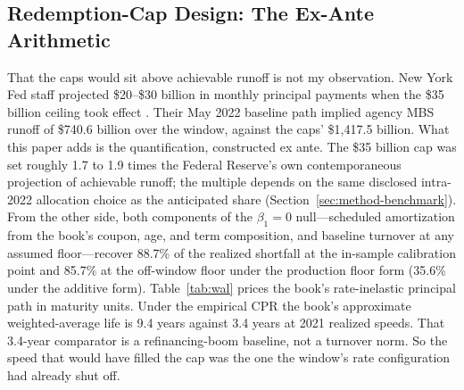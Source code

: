 \subsection{Redemption-Cap Design: The Ex-Ante Arithmetic}\label{sec:discussion-capdesign}

That the caps would sit above achievable runoff is not my observation. New York Fed staff projected \$20--\$30 billion in monthly principal payments when the \$35 billion ceiling took effect \citep{nyfed2022}. Their May 2022 baseline path implied agency MBS runoff of \$740.6 billion over the window, against the caps' \$1{,}417.5 billion. What this paper adds is the quantification, constructed ex ante. The \$35 billion cap was set roughly 1.7 to 1.9 times the Federal Reserve's own contemporaneous projection of achievable runoff; the multiple depends on the same disclosed intra-2022 allocation choice as the anticipated share (Section~\ref{sec:method-benchmark}). From the other side, both components of the $\beta_1 = 0$ null---scheduled amortization from the book's coupon, age, and term composition, and baseline turnover at any assumed floor---recover 88.7\% of the realized shortfall at the in-sample calibration point and 85.7\% at the off-window floor under the production floor form (35.6\% under the additive form). Table~\ref{tab:wal} prices the book's rate-inelastic principal path in maturity units. Under the empirical CPR the book's approximate weighted-average life is 9.4 years against 3.4 years at 2021 realized speeds. That 3.4-year comparator is a refinancing-boom baseline, not a turnover norm. So the speed that would have filled the cap was the one the window's rate configuration had already shut off.


